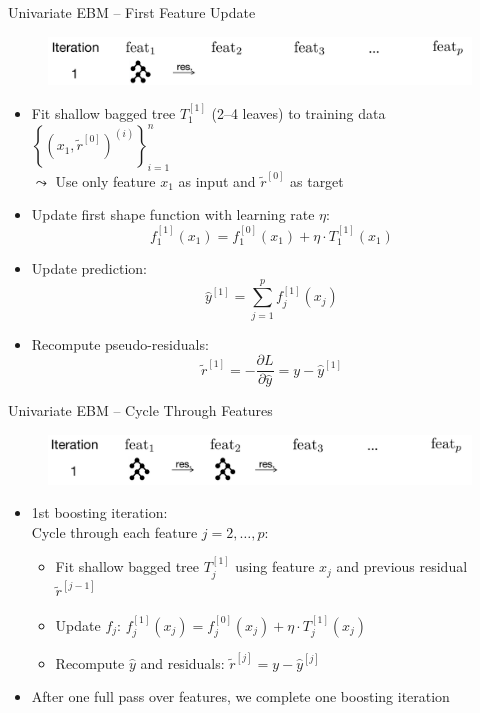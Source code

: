\documentclass[11pt,compress,t,notes=noshow, aspectratio=169, xcolor=table]{beamer}
\begin{document}
\begin{frame}{Univariate EBM – First Feature Update}
\begin{figure}
    \centering
    \includegraphics[width=\linewidth]{figure/EBM_Step1.png}
\end{figure}
\begin{itemize}
    \item Fit shallow bagged tree $T_1^{[1]}$ (2–4 leaves) to training data $\left\{\left(x_1, \tilde{r}^{[0]}\right)^{(i)}\right\}_{i=1}^n$\\
    $\leadsto$ Use only feature $x_1$ as input and $\tilde{r}^{[0]}$ as target
    \item Update first shape function with learning rate $\eta$:
    $$
    f_1^{[1]}(x_1) = f_1^{[0]}(x_1) + \eta \cdot T_1^{[1]}(x_1)
    $$
    \item Update prediction:
    $$
    \hat{y}^{[1]} = \sum_{j=1}^p f_j^{[1]}(x_j)
    $$
    \item Recompute pseudo-residuals:
    $$
    \tilde{r}^{[1]} =  -\frac{\partial L}{\partial \hat{y}} = y - \hat{y}^{[1]}
    $$
\end{itemize}

\end{frame}


\begin{frame}{Univariate EBM – Cycle Through Features}
\begin{figure}
    \centering
    \includegraphics[width=\linewidth]{figure/EBM_Step2.png}
\end{figure}
\begin{itemize}
    \item 1st boosting iteration: \\
    Cycle through each feature $j = 2,\dots,p$:
    \begin{itemize}
        \item Fit shallow bagged tree $T_j^{[1]}$ using feature $x_j$ and previous residual $\tilde{r}^{[j-1]}$ %
        \item Update $f_j$: $f_j^{[1]}(x_j) = f_j^{[0]}(x_j) + \eta \cdot T_j^{[1]}(x_j)$
        \item Recompute $\hat{y}$ and residuals: $\tilde{r}^{[j]} = y - \hat{y}^{[j]}$
    \end{itemize}
    \item After one full pass over features, we complete one boosting iteration
\end{itemize}
\end{frame}
\end{document}
